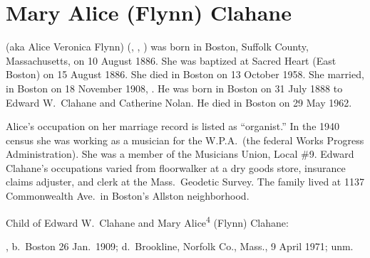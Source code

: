 \section{Mary Alice (Flynn) Clahane}

 (aka Alice Veronica Flynn) (, , ) was born in Boston, Suffolk County, Massachusetts, on 10 August 1886.\cite{MaryAlice4FlynnBirth} She was baptized at Sacred Heart (East Boston) on 15 August 1886.\cite{MaryAlice4FlynnBaptism} She died in Boston on 13 October 1958.\cite{MaryAlice4FlynnDeath} She married, in Boston on 18 November 1908, .\cite{MaryAlice4FlynnMarriage} He was born in Boston on 31 July 1888\cite{EdwardClahaneBirth} to Edward W.\ Clahane and Catherine Nolan.\cite{MaryAlice4FlynnMarriage} He died in Boston on 29 May 1962.\cite{EdwardClahaneDeath}

Alice's occupation on her marriage record is listed as ``organist.''\cite{MaryAlice4FlynnMarriage} In the 1940 census she was working as a musician for the W.P.A.\ (the federal Works Progress Administration).\cite{Census1940MaryAlice4Flynn} She was a member of the Musicians Union, Local \#9.\cite{MaryAlice4FlynnDeath} Edward Clahane's occupations varied from floorwalker at a dry goods store,\cite{Census1910EdwardClahane} insurance claims adjuster,\cite{Census1920EdwardClahane} and clerk at the Mass.\ Geodetic Survey.\cite{EdwardClahaneWWIIDraft} The family lived at 1137 Commonwealth Ave.\ in Boston's Allston neighborhood.\cite{Census1940MaryAlice4Flynn,MaryAlice4FlynnDeath}

\begin{KidsIntro}
	Child of Edward W.\ Clahane and Mary Alice\textsuperscript{4} (Flynn) Clahane:
\end{KidsIntro}

\begin{Kids}
	, b.\ Boston 26 Jan.\ 1909;\cite{Marion5ClahaneBirth} d.\ Brookline, Norfolk Co., Mass., 9 April 1971;\cite{Marion5ClahaneDeath} unm.
\end{Kids}
